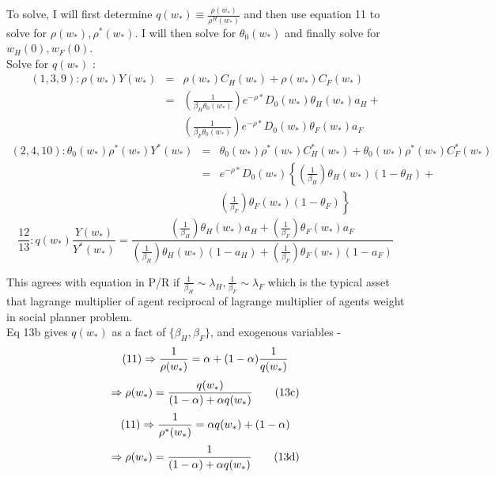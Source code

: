 \documentclass[]{article}
\begin{document}
To solve, I will first determine $q(w_*) \equiv \frac{\rho (w_*)}{\rho ^H(w_*)}$ and then use equation 11 to solve for $\rho (w_*), \rho ^*(w_*)$. I will then solve for $\theta _0(w_*)$ and finally solve for $w_H(0), w_F(0)$.\\

Solve for $q(w_*)$ : \\
\begin{eqnarray}
(1,3,9) : \rho(w_*) Y(w_*) &=& \rho (w_*) C_H(w_*) + \rho (w_*) C_F (w_*)\nonumber\\
&=& \left(\frac{1}{\beta _H \theta _0(w_*)}\right) e^{-\rho *} D_0(w_*) \theta _H (w_*) a_H + \nonumber \\
&& \left(\frac{1}{\beta _F \theta _0(w_*)}\right) e^{-\rho *} D_0(w_*) \theta _F (w_*) a_F 
\end{eqnarray}
\begin{eqnarray}
(2,4,10) : \theta _0(w_*) \rho ^*(w_*) Y^*(w_*) &=& \theta _0 (w_*) \rho ^*(w_*) C_H^* (w_*) + \theta _0 (w_*) \rho ^* (w_*) C_F^*(w_*)\nonumber\\
&=& e^{-\rho *} D_0(w_*) \left\{\left(\frac{1}{\beta_H}\right)\theta _H (w_*) (1-\theta_H)+ \right. \nonumber \\
&& \left. \left(\frac{1}{\beta_F}\right)\theta_F(w_*)(1-\theta_F)\right\}
\end{eqnarray}
\begin{equation*}
\frac{12}{13}:q(w_*) \frac{Y(w_*)}{Y^*(w_*)} = \frac{\left(\frac{1}{\beta_H}\right)\theta_H(w_*)a_H + \left(\frac{1}{\beta_F}\right)\theta_F(w_*)a_F}{\left(\frac{1}{\beta_H}\right)\theta_H(w_*)(1-a_H) + \left(\frac{1}{\beta_F}\right)\theta_F(w_*)(1-a_F)}\tag{13b}
\end{equation*}

This agrees with equation in P/R if $\frac{1}{\beta_H} \sim \lambda_H, \frac{1}{\beta_F} \sim \lambda_F$ which is the typical asset that lagrange multiplier of agent reciprocal of lagrange multiplier of agents weight in social planner problem.\\

Eq 13b gives $q(w_*)$ as a fact of $\{\beta_H, \beta_F\}$, and exogenous variables - 
\begin{equation}
(11) \Rightarrow \frac{1}{\rho (w_*)} = \alpha + (1-\alpha) \frac{1}{q(w_*)}\notag\\
\end{equation}
\begin{equation}
\Rightarrow  \rho (w_*) = \frac{q(w_*)}{(1-\alpha) + \alpha q(w_*)}\tag{13c}\\
\end{equation}
\begin{equation}
(11) \Rightarrow \frac{1}{\rho ^* (w_*)} = \alpha q (w_*) + (1-\alpha)\notag \\
\end{equation}
\begin{equation}
\Rightarrow  \rho (w_*) = \frac{1}{(1-\alpha) + \alpha q(w_*)}\tag{13d}\\
\end{equation}
\end{document}
